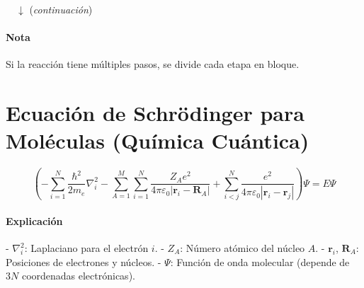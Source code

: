 \medskip


\medskip

$\quad \downarrow$ {\footnotesize (\emph{continuación})}$\quad$

\medskip



\paragraph*{Nota} Si la reacción tiene múltiples pasos, se divide cada etapa en bloque.

\section{Ecuación de Schrödinger para Moléculas (Química Cuántica)}

\[
\left( -\sum_{i=1}^N \frac{\hbar^2}{2m_e} \nabla_i^2 - \sum_{A=1}^M \sum_{i=1}^N \frac{Z_A e^2}{4\pi \varepsilon_0 |\mathbf{r}_i - \mathbf{R}_A|} + \sum_{i<j}^N \frac{e^2}{4\pi \varepsilon_0 |\mathbf{r}_i - \mathbf{r}_j|} \right) \Psi = E \Psi
\]

\paragraph*{Explicación}
- \(\nabla_i^2\): Laplaciano para el electrón \(i\).
- \(Z_A\): Número atómico del núcleo \(A\).
- \(\mathbf{r}_i\), \(\mathbf{R}_A\): Posiciones de electrones y núcleos.
- \(\Psi\): Función de onda molecular (depende de \(3N\) coordenadas electrónicas).

